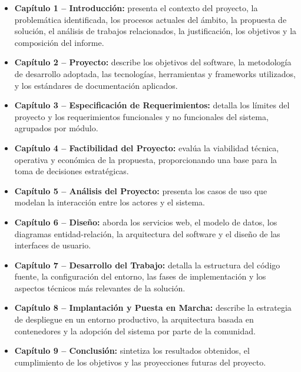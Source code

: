 \begin{itemize}
    \item \textbf{Capítulo 1 -- Introducción:} presenta el contexto del proyecto, la problemática identificada, los procesos actuales del ámbito, la propuesta de solución, el análisis de trabajos relacionados, la justificación, los objetivos y la composición del informe.

    \item \textbf{Capítulo 2 -- Proyecto:} describe los objetivos del software, la metodología de desarrollo adoptada, las tecnologías, herramientas y frameworks utilizados, y los estándares de documentación aplicados.

    \item \textbf{Capítulo 3 -- Especificación de Requerimientos:} detalla los límites del proyecto y los requerimientos funcionales y no funcionales del sistema, agrupados por módulo.

    \item \textbf{Capítulo 4 -- Factibilidad del Proyecto:} evalúa la viabilidad técnica, operativa y económica de la propuesta, proporcionando una base para la toma de decisiones estratégicas.

    \item \textbf{Capítulo 5 -- Análisis del Proyecto:} presenta los casos de uso que modelan la interacción entre los actores y el sistema.

    \item \textbf{Capítulo 6 -- Diseño:} aborda los servicios web, el modelo de datos, los diagramas entidad-relación, la arquitectura del software y el diseño de las interfaces de usuario.

    \item \textbf{Capítulo 7 -- Desarrollo del Trabajo:} detalla la estructura del código fuente, la configuración del entorno, las fases de implementación y los aspectos técnicos más relevantes de la solución.

    \item \textbf{Capítulo 8 -- Implantación y Puesta en Marcha:} describe la estrategia de despliegue en un entorno productivo, la arquitectura basada en contenedores y la adopción del sistema por parte de la comunidad.

    \item \textbf{Capítulo 9 -- Conclusión:} sintetiza los resultados obtenidos, el cumplimiento de los objetivos y las proyecciones futuras del proyecto.
\end{itemize} 

